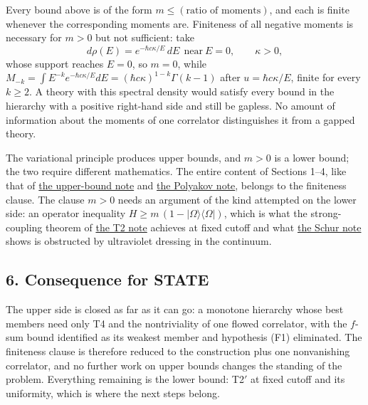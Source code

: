 \documentclass[11pt,a4paper]{article}
\begin{document}
Every bound above is of the form \(m\le(\text{ratio of moments})\), and
each is finite whenever the corresponding moments are. Finiteness of all
negative moments is necessary for \(m>0\) but not sufficient: take
\[d\rho(E)=e^{-\hbar c\kappa/E}\,dE\ \ \text{near}\ E=0,\qquad\kappa>0,\]
whose support reaches \(E=0\), so \(m=0\), while
\(M_{-k}=\int E^{-k}e^{-\hbar c\kappa/E}dE=(\hbar c\kappa)^{1-k}\Gamma(k-1)\)
after \(u=\hbar c\kappa/E\), finite for every \(k\ge2\). A theory with
this spectral density would satisfy every bound in the hierarchy with a
positive right-hand side and still be gapless. No amount of information
about the moments of one correlator distinguishes it from a gapped
theory.

The variational principle produces upper bounds, and \(m>0\) is a lower
bound; the two require different mathematics. The entire content of
Sections 1--4, like that of \href{lattice-gap-upper-bounds.md}{the
upper-bound note} and \href{polyakov-average-gap-bound.md}{the Polyakov
note}, belongs to the finiteness clause. The clause \(m>0\) needs an
argument of the kind attempted on the lower side: an operator inequality
\(H\ge m\,(1-|\Omega\rangle\langle\Omega|)\), which is what the
strong-coupling theorem of \href{strong-coupling-uniform-gap.md}{the T2
note} achieves at fixed cutoff and what
\href{weak-coupling-feshbach-reduction.md}{the Schur note} shows is obstructed by
ultraviolet dressing in the continuum.

\hypertarget{consequence-for-state}{%
\subsection{6. Consequence for STATE}\label{consequence-for-state}}

The upper side is closed as far as it can go: a monotone hierarchy whose
best members need only T4 and the nontriviality of one flowed
correlator, with the \(f\)-sum bound identified as its weakest member
and hypothesis (F1) eliminated. The finiteness clause is therefore
reduced to the construction plus one nonvanishing correlator, and no
further work on upper bounds changes the standing of the problem.
Everything remaining is the lower bound: T2\('\) at fixed cutoff and its
uniformity, which is where the next steps belong.
\end{document}
